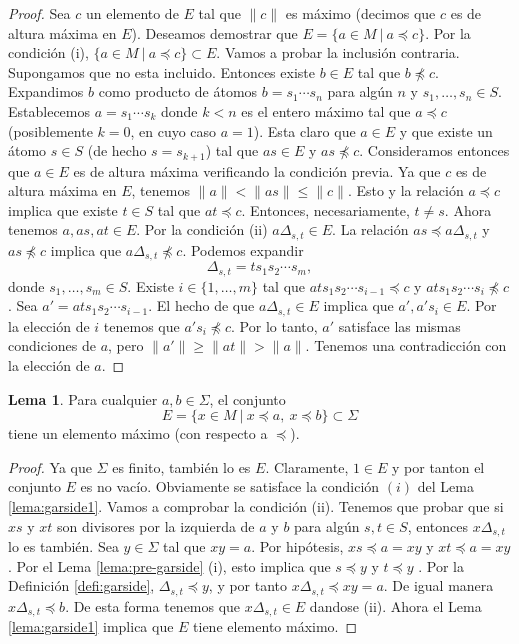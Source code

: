 \documentclass[12pt]{book}
\theoremstyle{definition}
\newtheorem{lema}{Lema}[section]
\providecommand{\norm}[1]{\lVert#1\rVert}
\begin{document}
\begin{proof} Sea $c$ un elemento de $E$ tal que $\norm{c}$ es máximo (decimos que $c$ es de altura máxima en $E$). Deseamos demostrar que $E=\{a\in M\ |\ a\preceq c\}$. Por la condición (i), $\{a\in M\ |\ a\preceq c\}\subset E$. Vamos a probar la inclusión contraria. Supongamos que no esta incluido. Entonces existe $b\in E$ tal que $b\npreceq c$. Expandimos $b$ como producto de átomos $b=s_1\cdots s_n$ para algún $n$ y $s_1,\ldots,s_n\in S$. Establecemos $a=s_1\cdots s_k$ donde $k < n$ es el entero máximo tal que $a\preceq c$ (posiblemente $k=0$, en cuyo caso $a=1$). Esta claro que $a\in E$ y que existe un átomo $s\in S$ (de hecho $s=s_{k+1}$) tal que $as\in E$ y $as\npreceq c$. Consideramos entonces que $a\in E$ es de altura máxima verificando la condición previa. Ya que $c$ es de altura máxima en $E$, tenemos $\norm{a}<\norm{as}\leq \norm{c}$. Esto y la relación $a\preceq c$ implica que existe $t\in S$ tal que $at\preceq c$. Entonces, necesariamente, $t\neq s$. Ahora tenemos  $a,as, at\in E$. Por la condición (ii) $a\Delta_{s,t}\in E$. La relación $as\preceq a\Delta_{s,t}$ y $as\npreceq c$ implica que $a\Delta_{s,t}\npreceq c$. Podemos expandir
$$\Delta_{s,t}=ts_1s_2\cdots s_m,$$
donde $s_1,\ldots,s_m\in S$. Existe $i\in\{1,\ldots,m\}$ tal que $ats_1s_2\cdots s_{i-1}\preceq c$ y $ats_1s_2\cdots s_{i}\npreceq c$. Sea $a'=ats_1s_2\cdots s_{i-1}$. El hecho de que $a\Delta_{s,t}\in E$ implica que $a',a's_i\in E$. Por la elección de $i$ tenemos que $a's_i\npreceq c$. Por lo tanto, $a'$ satisface las mismas condiciones de $a$, pero $\norm{a'}\geq \norm{at}> \norm{a}$. Tenemos una contradicción con la elección de $a$.\end{proof}

\begin{lema}
Para cualquier $a,b\in\Sigma$, el conjunto
$$E=\{x\in M\ |\ x\preceq a,\ x\preceq b\}\subset \Sigma$$
tiene un elemento máximo (con respecto a $\preceq$).
\label{lema:garside2}
\end{lema}

\begin{proof} Ya que $\Sigma$ es finito, también lo es $E$. Claramente, $1\in E$ y por tanton el conjunto $E$ es no vacío. Obviamente se satisface la condición $(i)$ del Lema \ref{lema:garside1}. Vamos a comprobar la condición (ii). Tenemos que probar que si $xs$ y $xt$ son divisores por la izquierda de $a$ y $b$ para algún $s,t\in S$, entonces $x\Delta_{s,t}$ lo es también. Sea $y\in\Sigma$ tal que $xy=a$. Por hipótesis, $xs\preceq a = xy$ y $xt\preceq a = xy$. Por el Lema \ref{lema:pre-garside} (i), esto implica que $s\preceq y$ y $t\preceq y$ . Por la Definición \ref{defi:garside}, $\Delta_{s,t}\preceq y$, y por tanto $x\Delta_{s,t}\preceq xy=a$. De igual manera $x\Delta_{s,t}\preceq b$. De esta forma tenemos que $x\Delta_{s,t}\in E$ dandose (ii). Ahora el Lema \ref{lema:garside1} implica que $E$ tiene elemento máximo.
\end{proof}
\end{document}
